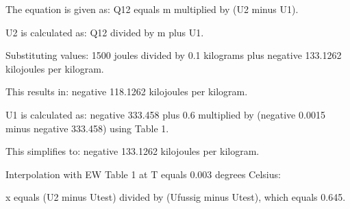 The equation is given as:  
Q12 equals m multiplied by (U2 minus U1).  

U2 is calculated as:  
Q12 divided by m plus U1.  

Substituting values:  
1500 joules divided by 0.1 kilograms plus negative 133.1262 kilojoules per kilogram.  

This results in:  
negative 118.1262 kilojoules per kilogram.  

U1 is calculated as:  
negative 333.458 plus 0.6 multiplied by (negative 0.0015 minus negative 333.458) using Table 1.  

This simplifies to:  
negative 133.1262 kilojoules per kilogram.  

Interpolation with EW Table 1 at T equals 0.003 degrees Celsius:  

x equals (U2 minus Utest) divided by (Ufussig minus Utest), which equals 0.645.
